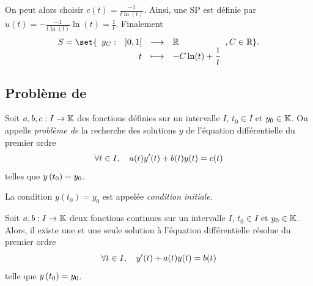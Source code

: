 \documentclass{magnoliaold}
\begin{document}
\begin{exos}
\begin{victor}
\begin{sol}
  On peut alors choisir $c(t)=\frac{-1}{t\ln(t)}$. Ainsi, une SP est définie par $u(t)=-\frac{-1}{t\ln(t)}\ln(t)=\frac{1}{t}$.
  Finalement $$S=\set{\dspappli{y_C}{]0,1[}{\R}{t}{-C\ln(t)+\frac{1}{t}}, C\in \R}.$$
  \end{sol}
    \end{victor}
\end{exos}

\subsection{Problème de }

\begin{definition}[nom={Problème de \nom{Cauchy}}]
Soit $a,b,c:I\to\mathbb{K}$ des fonctions définies sur un intervalle $I$, $t_0\in I$ et
$y_0\in\mathbb{K}$. On appelle \emph{problème de } la recherche des solutions $y$ de
l'équation différentielle du premier ordre
\[\forall t\in I ,\quad a(t)y'(t)+b(t)y(t)=c(t)\]
telles que $y\left(t_0\right)=y_0$.
\end{definition}

\begin{remarqueUnique}
\remarque La condition $y(t_0)=y_0$ est appelée \emph{condition initiale}.
\end{remarqueUnique}

\begin{theoreme}[nom={Théorème de \nom{Cauchy-Lipschitz}}]
Soit $a,b:I\to\mathbb{K}$ deux fonctions continues sur un intervalle $I$,
$t_0\in I$ et $y_0\in\mathbb{K}$. Alors, il existe une et une seule solution à 
l'équation différentielle résolue du premier ordre
\[\forall t\in I ,\quad y'(t)+a(t)y(t)=b(t)\]
telle que $y\left(t_0\right)=y_0$.
\end{theoreme}
\end{document}
